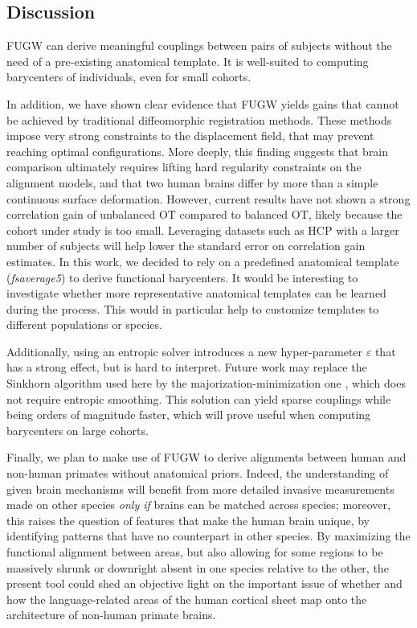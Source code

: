 \subsection{Discussion}

FUGW can derive meaningful couplings between pairs of subjects without
the need of a pre-existing anatomical template. It is well-suited to computing
barycenters of individuals, even for small cohorts.

In addition, we have shown clear evidence that FUGW yields gains that cannot be achieved
by traditional diffeomorphic registration methods.
These methods impose very strong constraints to the displacement field,
that may prevent reaching optimal configurations.
More deeply, this finding suggests that brain comparison ultimately requires
lifting hard regularity constraints on the alignment models,
and that two human brains differ by more than a simple continuous surface deformation.
However, current results have not shown a strong correlation gain of
unbalanced OT compared to balanced OT, likely because the cohort under study is too small.
Leveraging datasets such as HCP \citep{hcpdata} with a larger number of subjects
will help lower the standard error on correlation gain estimates.
In this work, we decided to rely on a predefined anatomical template (\emph{fsaverage5})
to derive functional barycenters.
It would be interesting to investigate whether more representative anatomical templates
can be learned during the process.
This would in particular help to customize templates to different populations or species.

Additionally, using an entropic solver introduces a new hyper-parameter $\varepsilon$
that has a strong effect, but is hard to interpret.
Future work may replace the Sinkhorn algorithm \citep{Sejourne19}
used here by the majorization-minimization one \citep{Chapel20},
which does not require entropic smoothing. This solution can yield sparse couplings
while being orders of magnitude faster, which will prove useful when computing barycenters
on large cohorts.

Finally, we plan to make use of FUGW to derive alignments between human and
non-human primates without anatomical priors. Indeed, the understanding of given brain mechanisms
will benefit from more detailed invasive measurements made on other species \emph{only if}
brains can be matched across species; moreover, this  raises the question of features
that make the human brain unique, by identifying patterns that have no counterpart in other species.
By maximizing the functional alignment between areas, but also allowing for some regions
to be massively shrunk or downright absent in one species relative to the other,
the present tool could shed an objective light on the important issue of whether
and how the language-related areas of the human cortical sheet map onto
the architecture of non-human primate brains.